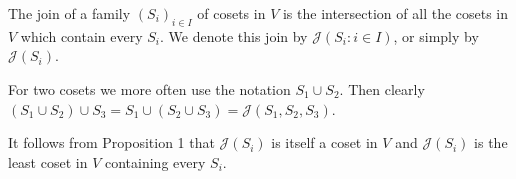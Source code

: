 The join of a family $(S_i)_{i \in I}$ of cosets in $V$ is the intersection of all the cosets in $V$ which contain every $S_i$. We denote this join by $\mathcal{J}(S_i: i \in I)$, or simply by $\mathcal{J}(S_i)$.

For two cosets we more often use the notation $S_1 \cup S_2$. Then clearly $(S_1 \cup S_2) \cup S_3 = S_1 \cup (S_2 \cup S_3) = \mathcal{J}(S_1, S_2, S_3)$.

It follows from Proposition 1 that $\mathcal{J}(S_i)$ is itself a coset in $V$ and $\mathcal{J}(S_i)$ is the least coset in $V$ containing every $S_i$.
